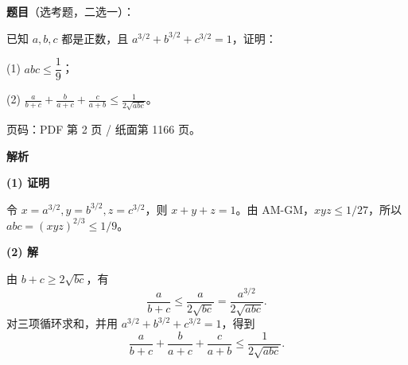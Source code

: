 \begin{answer}

\textbf{题目}（选考题，二选一）：

已知 $a,b,c$ 都是正数，且 $a^{3/2}+b^{3/2}+c^{3/2}=1$，证明：

  (1) $abc\le\dfrac19$；

  (2) $\displaystyle\frac{a}{b+c}+\frac{b}{a+c}+\frac{c}{a+b}\le\frac1{2\sqrt{abc}}$。

\begin{gktip}
页码：PDF 第 2 页 / 纸面第 1166 页。
\end{gktip}

\textbf{解析}

\textbf{(1) 证明}

令 $x=a^{3/2},y=b^{3/2},z=c^{3/2}$，则 $x+y+z=1$。由 AM-GM，$xyz\le1/27$，所以 $abc=(xyz)^{2/3}\le1/9$。

\textbf{(2) 解}

由 $b+c\ge2\sqrt{bc}$，有
\nopagebreak[4]
\[
\frac a{b+c}\le\frac a{2\sqrt{bc}}
=\frac{a^{3/2}}{2\sqrt{abc}}.
\]
对三项循环求和，并用 $a^{3/2}+b^{3/2}+c^{3/2}=1$，得到
\nopagebreak[4]
\[
\frac a{b+c}+\frac b{a+c}+\frac c{a+b}\le\frac1{2\sqrt{abc}}.
\]



\end{answer}